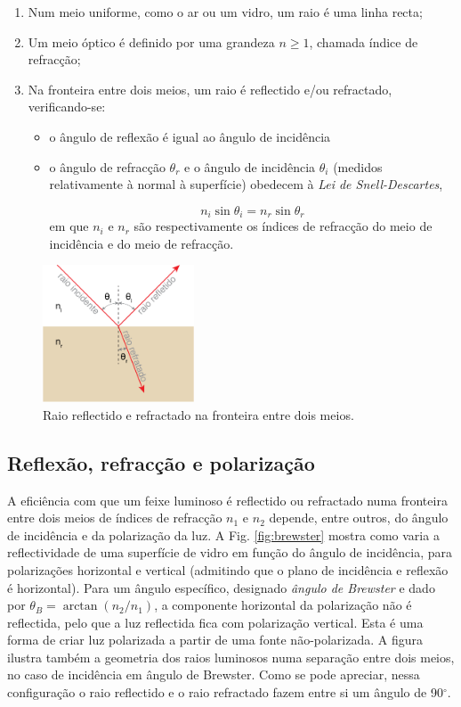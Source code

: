 \documentclass[a4paper,twoside,11pt]{report}      %
\begin{document}
\begin{enumerate}
\item Num meio uniforme, como o ar ou um vidro, um raio é uma linha recta;
\item Um meio óptico é definido por uma grandeza $n\geq1$, chamada índice de refracção;
\item Na fronteira entre dois meios, um raio é reflectido e/ou refractado, verificando-se:
\begin{itemize}
\item o ângulo de reflexão é igual ao ângulo de incidência
\item o ângulo de refracção $\theta_r$ e o ângulo de incidência $\theta_i$ (medidos relativamente à normal à superfície) obedecem à \emph{Lei de Snell-Descartes},

\begin{equation}
n_i\sin{\theta_i}=n_r\sin{\theta_r}
\end{equation}
em que $n_i$ e $n_r$ são respectivamente os índices de refracção do meio de incidência e do meio de refracção.
\end{itemize}
\end{enumerate}
\begin{figure}
\begin{center}
	\includegraphics[width=0.4\textwidth]{1-snell}
	\caption{Raio reflectido e refractado na fronteira entre dois meios.}
	 \label{fig:snell}
\end{center}
\end{figure}

\subsection{\sf Reflexão, refracção e polarização}

A eficiência com que um feixe luminoso é reflectido ou refractado numa fronteira entre dois meios de índices de refracção $n_1$ e $n_2$ depende, entre outros, do ângulo de incidência e da polarização da luz. A Fig. \ref{fig:brewster} mostra como varia a reflectividade de uma superfície de vidro em função do ângulo de incidência, para polarizações horizontal e vertical (admitindo que o plano de incidência e reflexão é horizontal). Para um ângulo específico, designado \emph{ângulo de Brewster} e dado por $\theta_B=\arctan(n_2/n_1)$, a componente horizontal da polarização não é reflectida, pelo que a luz reflectida fica com polarização vertical. Esta é uma forma de criar luz polarizada a partir de uma fonte não-polarizada. A figura ilustra também a geometria dos raios luminosos numa separação entre dois meios, no caso de incidência em ângulo de Brewster. Como se pode apreciar, nessa configuração o raio reflectido e o raio refractado fazem entre si um ângulo de 90$^\circ$.
\end{document}
